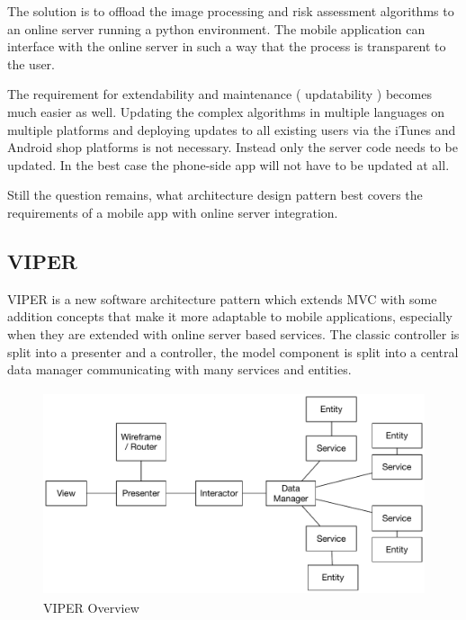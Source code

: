 The solution is to offload the image processing and risk assessment algorithms to an online server running a python environment. The mobile application can interface with the online server in such a way that the process is transparent to the user.

The requirement for extendability and maintenance ( updatability ) becomes much easier as well. Updating the complex algorithms in multiple languages on multiple platforms and deploying updates to all existing users via the iTunes and Android shop platforms is not necessary. Instead only the server code needs to be updated. In the best case the phone-side app will not have to be updated at all.

Still the question remains, what architecture design pattern best covers the requirements of a mobile app with online server integration.

\subsection{VIPER}

VIPER is a new software architecture pattern which extends MVC with some addition concepts that make it more adaptable to mobile applications, especially when they are extended with online server based services. The classic controller is split into a presenter and a controller, the model component is split into a central data manager communicating with many services and entities\cite{viper}.

\begin{figure}[H]
    \centering
    \includegraphics[height=6cm,keepaspectratio]{assets/concept/viper.pdf}
    \caption{VIPER Overview}
    \label{fig:viper}
\end{figure}

